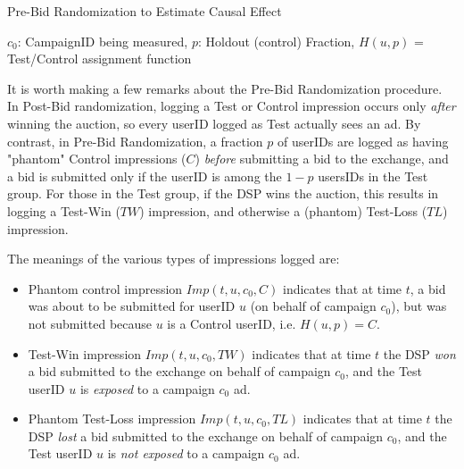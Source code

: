 \documentclass[11pt,a4paper]{article}
\theoremstyle{definition}
\theoremstyle{remark}
\theoremstyle{definition}
\theoremstyle{definition}
\theoremstyle{definition}
\theoremstyle{definition}
\theoremstyle{definition}
\theoremstyle{definition}
\begin{document}
\begin{algorithm} 
 \caption{Pre-Bid Randomization to Estimate Causal Effect}
    \label{alg:pre-bid}
\begin{algorithmic}[1]
\Require 
$c_0$: CampaignID being measured, 
$p$: Holdout (control) Fraction,
$H(u,p)$ = Test/Control assignment function
 
 

\Else {}	 
		\EndIf
	\EndIf
\EndIf			
\EndWhile
\end{algorithmic}	
\end{algorithm}


It is worth making a few remarks about the Pre-Bid Randomization procedure. In Post-Bid randomization, logging a Test or Control impression occurs only {\em after} winning the auction, so every userID logged as Test actually sees an ad. By contrast, in Pre-Bid Randomization, a fraction $p$ of userIDs are logged as having "phantom" Control impressions ($C$) {\em before} submitting a bid to the exchange, and a bid is submitted only if the userID is among the $1-p$ usersIDs in the Test group. For those in the Test group, if the DSP wins the auction, this results in logging a Test-Win ($TW$) impression, and otherwise a (phantom) Test-Loss ($TL$) impression. 

The meanings of the various types of impressions logged are:
\begin{itemize}
	\item Phantom control impression $Imp(t, u, c_0, C)$ indicates that at time $t$, a bid was about to be submitted for userID $u$ (on behalf of campaign $c_0$), but was not submitted because $u$ is a Control userID, i.e. $H(u,p) = C$.
	\item Test-Win impression $Imp(t, u, c_0, TW)$ indicates that at time $t$ the DSP {\em won} a bid submitted to the exchange on behalf of campaign $c_0$, and the Test userID $u$ is {\em exposed} to a campaign $c_0$ ad.
	\item Phantom Test-Loss impression $Imp(t, u, c_0, TL)$ indicates that at time $t$ the DSP \textit{lost} a bid submitted to the exchange on behalf of campaign $c_0$, and the Test userID $u$ is {\em not exposed} to a campaign $c_0$ ad.
\end{itemize}
\end{document}
